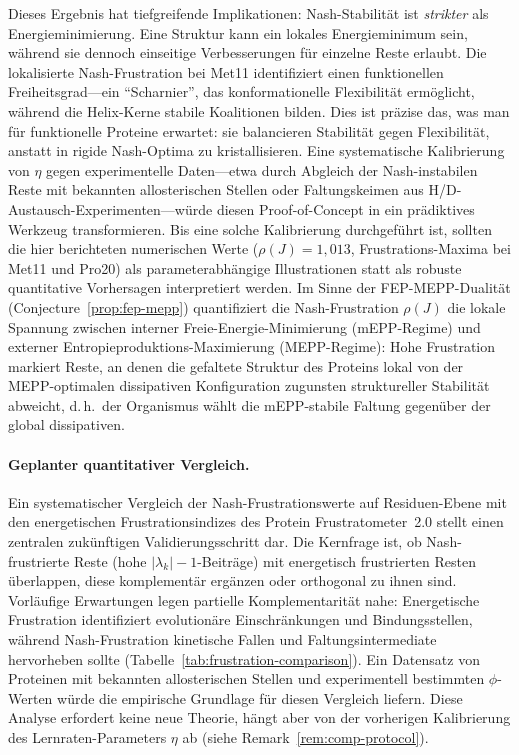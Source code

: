 \documentclass[12pt,a4paper]{article}
\theoremstyle{remark}
\begin{document}
Dieses Ergebnis hat tiefgreifende Implikationen: Nash-Stabilit\"at ist \textit{strikter} als Energieminimierung. Eine Struktur kann ein lokales Energieminimum sein, w\"ahrend sie dennoch einseitige Verbesserungen f\"ur einzelne Reste erlaubt. Die lokalisierte Nash-Frustration bei Met11 identifiziert einen funktionellen Freiheitsgrad---ein ``Scharnier'', das konformationelle Flexibilit\"at erm\"oglicht, w\"ahrend die Helix-Kerne stabile Koalitionen bilden. Dies ist pr\"azise das, was man f\"ur funktionelle Proteine erwartet: sie balancieren Stabilit\"at gegen Flexibilit\"at, anstatt in rigide Nash-Optima zu kristallisieren. Eine systematische Kalibrierung von $\eta$ gegen experimentelle Daten---etwa durch Abgleich der Nash-instabilen Reste mit bekannten allosterischen Stellen oder Faltungskeimen aus H/D-Austausch-Experimenten---w\"urde diesen Proof-of-Concept in ein pr\"adiktives Werkzeug transformieren. Bis eine solche Kalibrierung durchgef\"uhrt ist, sollten die hier berichteten numerischen Werte ($\rho(J) = 1{,}013$, Frustrations-Maxima bei Met11 und Pro20) als parameterabh\"angige Illustrationen statt als robuste quantitative Vorhersagen interpretiert werden.
Im Sinne der FEP-MEPP-Dualit\"at (Conjecture~\ref{prop:fep-mepp}) quantifiziert die Nash-Frustration $\rho(J)$ die lokale Spannung zwischen interner Freie-Energie-Minimierung (mEPP-Regime) und externer Entropieproduktions-Maximierung (MEPP-Regime): Hohe Frustration markiert Reste, an denen die gefaltete Struktur des Proteins lokal von der MEPP-optimalen dissipativen Konfiguration zugunsten struktureller Stabilit\"at abweicht, d.\,h.\ der Organismus w\"ahlt die mEPP-stabile Faltung gegen\"uber der global dissipativen.

\paragraph{Geplanter quantitativer Vergleich.}
Ein systematischer Vergleich der Nash-Frustrationswerte auf Residuen-Ebene mit den energetischen Frustrationsindizes des Protein Frustratometer~2.0 \cite{ParraFerreiro2016} stellt einen zentralen zuk\"unftigen Validierungsschritt dar. Die Kernfrage ist, ob Nash-frustrierte Reste (hohe $|\lambda_k|-1$-Beitr\"age) mit energetisch frustrierten Resten \"uberlappen, diese komplement\"ar erg\"anzen oder orthogonal zu ihnen sind. Vorl\"aufige Erwartungen legen partielle Komplementarit\"at nahe: Energetische Frustration identifiziert evolution\"are Einschr\"ankungen und Bindungsstellen, w\"ahrend Nash-Frustration kinetische Fallen und Faltungsintermediate hervorheben sollte (Tabelle~\ref{tab:frustration-comparison}). Ein Datensatz von Proteinen mit bekannten allosterischen Stellen und experimentell bestimmten $\phi$-Werten w\"urde die empirische Grundlage f\"ur diesen Vergleich liefern. Diese Analyse erfordert keine neue Theorie, h\"angt aber von der vorherigen Kalibrierung des Lernraten-Parameters $\eta$ ab (siehe Remark~\ref{rem:comp-protocol}).
\end{document}
